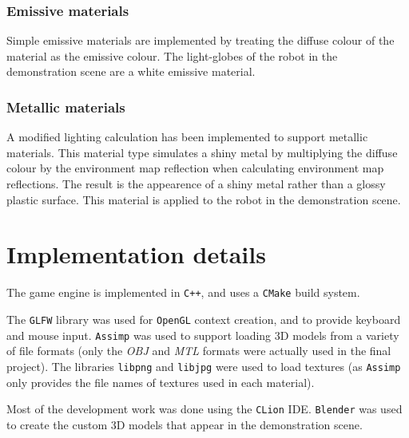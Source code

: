 \documentclass[11pt]{scrartcl} %
\newcommand{\libraryname}[1]{{\texttt{#1}}}
\newcommand{\codefile}[1]{{\textit{#1}}}
\begin{document}
        \subsubsection{Emissive materials}

            Simple emissive materials are implemented by treating the diffuse
            colour of the material as the emissive colour. The light-globes of
            the robot in the demonstration scene are a white emissive material.

        \subsubsection{Metallic materials}

            A modified lighting calculation has been implemented to support
            metallic materials. This material type simulates a shiny metal by
            multiplying the diffuse colour by the environment map reflection
            when calculating environment map reflections. The result is the
            appearence of a shiny metal rather than a glossy plastic surface.
            This material is applied to the robot in the demonstration scene.


\section{Implementation details}


    The game engine is implemented in \libraryname{C++}, and uses a
    \libraryname{CMake} build system.


    The \libraryname{GLFW} library was used for \libraryname{OpenGL} context
    creation, and to provide keyboard and mouse input.
%
    \libraryname{Assimp} was used to support loading 3D models from a variety
    of file formats (only the \codefile{OBJ} and \codefile{MTL} formats were
    actually used in the final project).
%
    The libraries \libraryname{libpng} and \libraryname{libjpg} were used to
    load textures (as \libraryname{Assimp} only provides the file names of
    textures used in each material).


    Most of the development work was done using the \libraryname{CLion} IDE.
    \libraryname{Blender} was used to create the custom 3D models that appear
    in the demonstration scene.
\end{document}
